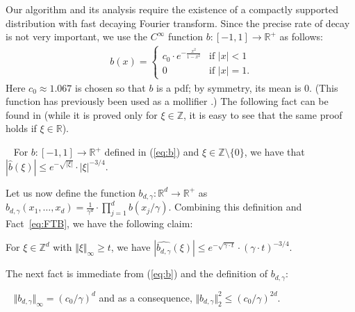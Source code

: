 Our algorithm and its analysis require the existence of a compactly supported distribution with fast decaying Fourier transform. Since the precise rate of decay is not very important, 
we use the $C^{\infty}$ function $b: [-1,1] \rightarrow \mathbb{R}^+$ as follows: 
\begin{eqnarray}~\label{eq:b}
b(x) = 
\begin{cases}
c_0 \cdot e^{-\frac{x^2}{1-x^2}} &\textrm{if } |x|<1 \\
0 &\textrm{if } |x|=1.
\end{cases}
\end{eqnarray}
Here $c_0 \approx 1.067$ is chosen so that 
$b$ is a pdf;  by symmetry, its mean is $0$.
(This function has previously been used as a
mollifier \citep{kane2010exact,diakonikolas2010bounded}.)
The following fact can be found in \cite{johnson2015saddle} (while it is proved only for $\xi \in \mathbb{Z}$, it is easy to see that the same proof holds if $\xi \in \mathbb{R}$). 
\begin{fact}~\label{eq:FTB}
For $b:[-1,1] \rightarrow \mathbb{R}^+$ defined in (\ref{eq:b}) and $\xi \in \mathbb{Z} \setminus \{0\}$,  we have that $|\widehat{b}(\xi)| \le e^{-\sqrt{|\xi|}} \cdot |\xi|^{-3/4}$. 
\end{fact}

Let us now define the function $b_{d,\gamma}: \mathbb{R}^d \rightarrow \mathbb{R}^+$ as 
$b_{d,\gamma}(x_1, \ldots, x_d) = \frac{1}{\gamma^d} \cdot \prod_{j=1}^d b(x_j/\gamma).$
Combining this definition and Fact~\ref{eq:FTB}, we have the following claim:
\begin{claim}\label{clm:Fourier-b}
For $\xi \in \mathbb{Z}^d$ with $\Vert \xi \Vert_\infty \ge t$, we have $|\widehat{b_{d,\gamma}}(\xi)| \le e^{-\sqrt{\gamma \cdot t}} \cdot (\gamma \cdot t)^{-3/4}$. 
\end{claim}
The next fact is immediate from (\ref{eq:b}) and the definition of $b_{d,\gamma}$:
\begin{fact}~\label{fact:b-sup-density}
$\Vert b_{d,\gamma} \Vert_\infty = (c_0/\gamma)^d$ and as a consequence,
 $\Vert b_{d,\gamma} \Vert_2^2 \le  (c_0/\gamma)^{2d}$.
\end{fact}


